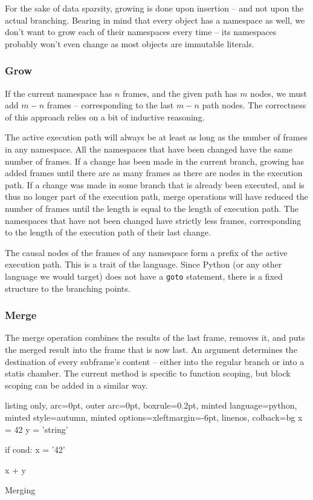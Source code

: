 \documentclass[a4paper, 16pt, oneside]{Thesis}
\begin{document}
For the sake of data sparsity, growing is done upon insertion -- and not
upon the actual branching. Bearing in mind that every object has a
namespace as well, we don't want to grow each of their namespaces every
time -- its namespaces probably won't even change as most objects are
immutable literals.

\subsubsection{Grow}\label{grow}

If the current namespace has \(n\) frames, and the given path has \(m\)
nodes, we must add \(m-n\) frames -- corresponding to the last \(m-n\)
path nodes. The correctness of this approach relies on a bit of
inductive reasoning.

The active execution path will always be at least as long as the number
of frames in any namespace. All the namespaces that have been changed
have the same number of frames. If a change has been made in the current
branch, growing has added frames until there are as many frames as there
are nodes in the execution path. If a change was made in some branch
that is already been executed, and is thus no longer part of the
execution path, merge operations will have reduced the number of frames
until the length is equal to the length of execution path. The
namespaces that have not been changed have strictly less frames,
corresponding to the length of the execution path of their last change.

The causal nodes of the frames of any namespace form a prefix of the
active execution path. This is a trait of the language. Since Python (or
any other language we would target) does not have a \texttt{goto}
statement, there is a fixed structure to the branching points.

\subsubsection{Merge}\label{merge}

The merge operation combines the results of the last frame, removes it,
and puts the merged result into the frame that is now last. An argument
determines the destination of every subframe's content -- either into
the regular branch or into a statis chamber. The current method is
specific to function scoping, but block scoping can be added in a
similar way.

\begin{code}
  \begin{tcblisting}{listing only, 
  arc=0pt,
  outer arc=0pt, 
  boxrule=0.2pt,
  minted language=python,
  minted style=autumn,
  minted options={xleftmargin=-6pt, linenos},
  colback=bg }
x = 42
y = 'string'

if cond:
  x = '42'

x + y 
\end{tcblisting}
\caption{Merging}\label{smp:merge}
\end{code}
\end{document}

